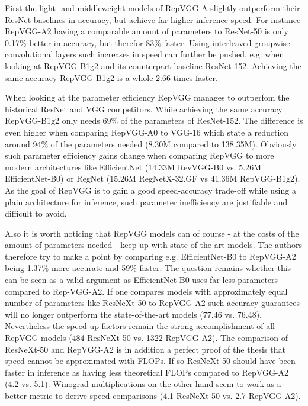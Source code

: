 First the light- and middleweight models of RepVGG-A slightly outperform their ResNet baselines in accuracy, but achieve far higher inference speed. For instance RepVGG-A2 having a comparable amount of parameters to ResNet-50 is only 0.17\% better in accuracy, but therefor 83\% faster. Using interleaved groupwise convolutional layers such increases in speed can further be pushed, e.g. when looking at RepVGG-B1g2 and its counterpart baseline ResNet-152. Achieving the same accuracy RepVGG-B1g2 is a whole 2.66 times faster. 

When looking at the parameter efficiency RepVGG manages to outperfom the historical ResNet and VGG competitors. While achieving the same accuracy RepVGG-B1g2 only needs 69\% of the parameters of ResNet-152. The difference is even higher when comparing RepVGG-A0 to VGG-16 which state a reduction around 94\% of the parameters needed (8.30M compared to 138.35M). Obviously such parameter efficiency gains change when comparing RepVGG to more modern architectures like EfficientNet (14.33M RevVGG-B0 vs. 5.26M EfficientNet-B0) or RegNet (15.26M RegNetX-32.GF vs 41.36M RepVGG-B1g2). As the goal of RepVGG is to gain a good speed-accuracy trade-off while using a plain architecture for inference, such parameter inefficiency are justifiable and difficult to avoid. 

Also it is worth noticing that RepVGG models can of course - at the costs of the amount of parameters needed - keep up with state-of-the-art models. The authors therefore try to make a point by comparing e.g. EfficientNet-B0 to RepVGG-A2 being 1.37\% more accurate and 59\% faster. The question remains whether this can be seen as a valid argument as EfficientNet-B0 uses far less parameters compared to Rep-VGG-A2. If one compares models with approximately equal number of parameters like ResNeXt-50 to RepVGG-A2 such accuracy guarantees will no longer outperform the state-of-the-art models (77.46 vs. 76.48). Nevertheless the speed-up factors remain the strong accomplishment of all RepVGG models (484 ResNeXt-50 vs. 1322 RepVGG-A2). The comparison of ResNeXt-50 and RepVGG-A2 is in addition a perfect proof of the thesis that speed cannot be approximated with FLOPs. If so ResNeXt-50 should have been faster in inference as having less theoretical FLOPs compared to RepVGG-A2 (4.2 vs. 5.1). Winograd multiplications on the other hand seem to work as a better metric to derive speed comparisons (4.1 ResNeXt-50 vs. 2.7 RepVGG-A2). 

